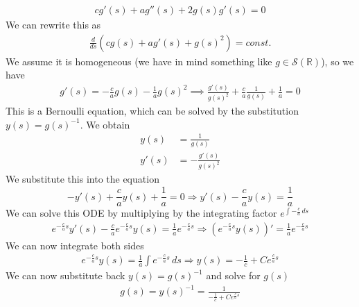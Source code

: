 \begin{enumerate}
\[\begin{split}
                  cg'(s) + a g''(s) + 2 g(s) g'(s) = 0
              \end{split}
          \]
          We can rewrite this as
          \[
              \begin{split}
                  \frac{d}{ds} \left(cg(s) + a g'(s) + g(s)^2\right) = const.
              \end{split}
          \]
          We assume it is homogeneous (we have in mind something like \(g\in
          \mathcal{S}(\mathbb{R})\)), so we have
          \[
              \begin{split}
                  g'(s) =- \frac{c}{a} g(s)  -\frac{1}{a} g(s)^2  \implies \frac{g'(s)}{g(s)^2} + \frac{c}{a} \frac{1}{g(s)} + \frac{1}{a} = 0
              \end{split}
          \]
          This is a Bernoulli equation, which can be solved by the substitution \(y(s) =
          g(s)^{-1}\). We obtain
          \[
              \begin{split}
                  y(s)  & = \frac{1}{g(s)}        \\
                  y'(s) & = -\frac{g'(s)}{g(s)^2}
              \end{split}
          \]
          We substitute this into the equation
          \[
              -y'(s) + \frac{c}{a} y(s) + \frac{1}{a} = 0 \Rightarrow y'(s) - \frac{c}{a} y(s) = \frac{1}{a}
          \]
          We can solve this ODE by multiplying by the integrating factor \(e^{\int
                  -\frac{c}{a} \, ds}\)
          \[
              \begin{split}
                  e^{-\frac{c}{a}s} y'(s) - \frac{c}{a} e^{-\frac{c}{a}s} y(s) = \frac{1}{a} e^{-\frac{c}{a}s} \Rightarrow \left(e^{-\frac{c}{a}s} y(s)\right)' = \frac{1}{a} e^{-\frac{c}{a}s}
              \end{split}
          \]
          We can now integrate both sides
          \[
              \begin{split}
                  e^{-\frac{c}{a}s} y(s) = \frac{1}{a} \int e^{-\frac{c}{a}s} \, ds \Rightarrow y(s) = -\frac{1}{c} + C e^{\frac{c}{a}s}
              \end{split}
          \]
          We can now substitute back \(y(s) = g(s)^{-1}\) and solve for \(g(s)\)
          \[
              \begin{split}
                  g(s) = y(s)^{-1} = \frac{1}{-\frac{1}{c} + C e^{\frac{c}{a}s}}
              \end{split}
          \]
\end{enumerate}


